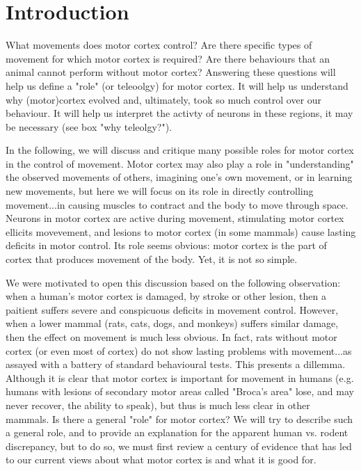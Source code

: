 \section{Introduction}

What movements does motor cortex control? Are there specific types of movement for which motor cortex is required? Are there behaviours that an animal cannot perform without motor cortex? Answering these questions will help us define a "role" (or teleoolgy) for motor cortex. It will help us understand why (motor)cortex evolved and, ultimately, took so much control over our behaviour. It will help us interpret the activty of neurons in these regions, it may be necessary (see box "why teleolgy?").

In the following, we will discuss and critique many possible roles for motor cortex in the control of movement. Motor cortex may also play a role in "understanding" the observed movements of others, imagining one's own movement, or in learning new movements, but here we will focus on its role in directly controlling movement...in causing muscles to contract and the body to move through space. Neurons in motor cortex are active during movement, stimulating motor cortex ellicits movevement, and lesions to motor cortex (in some mammals) cause lasting deficits in motor control. Its role seems obvious: motor cortex is the part of cortex that produces movement of the body. Yet, it is not so simple.

We were motivated to open this discussion based on the following observation: when a human's motor cortex is damaged, by stroke or other lesion, then a paitient suffers severe and conspicuous deficits in movement control. However, when a lower mammal (rats, cats, dogs, and monkeys) suffers similar damage, then the effect on movement is much less obvious. In fact, rats without motor cortex (or even most of cortex) do not show lasting problems with movement...as assayed with a battery of standard behavioural tests. This presents a dillemma. Although it is clear that motor cortex is important for movement in humans (e.g. humans with lesions of secondary motor areas called "Broca's area" lose, and may never recover, the ability to speak), but thus is much less clear in other mammals. Is there a general "role" for motor cortex? We will try to describe such a general role, and to provide an explanation for the apparent human vs. rodent discrepancy, but to do so, we must first review a century of evidence that has led to our current views about what motor cortex is and what it is good for. 

